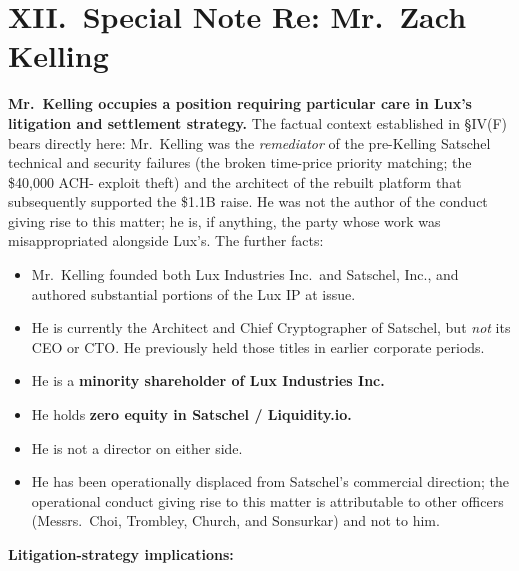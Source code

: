 \documentclass[11pt,letterpaper]{article}
\begin{document}
\section*{XII.\ Special Note Re: Mr.\ Zach Kelling}

\textbf{Mr.\ Kelling occupies a position requiring particular care
in Lux's litigation and settlement strategy.} The factual context
established in \S IV(F) bears directly here: Mr.\ Kelling was the
\emph{remediator} of the pre-Kelling Satschel technical and security
failures (the broken time-price priority matching; the \$40,000 ACH-
exploit theft) and the architect of the rebuilt platform that
subsequently supported the \$1.1B raise. He was not the author of
the conduct giving rise to this matter; he is, if anything, the
party whose work was misappropriated alongside Lux's. The further
facts:

\begin{itemize}[leftmargin=1.5em,itemsep=0.1em]
\item Mr.\ Kelling founded both Lux Industries Inc.\ and Satschel,
Inc., and authored substantial portions of the Lux IP at issue.
\item He is currently the Architect and Chief Cryptographer of
Satschel, but \emph{not} its CEO or CTO. He previously held those
titles in earlier corporate periods.
\item He is a \textbf{minority shareholder of Lux Industries Inc.}
\item He holds \textbf{zero equity in Satschel / Liquidity.io.}
\item He is not a director on either side.
\item He has been operationally displaced from Satschel's
commercial direction; the operational conduct giving rise to this
matter is attributable to other officers (Messrs.\ Choi, Trombley,
Church, and Sonsurkar) and not to him.
\end{itemize}

\textbf{Litigation-strategy implications:}
\end{document}
